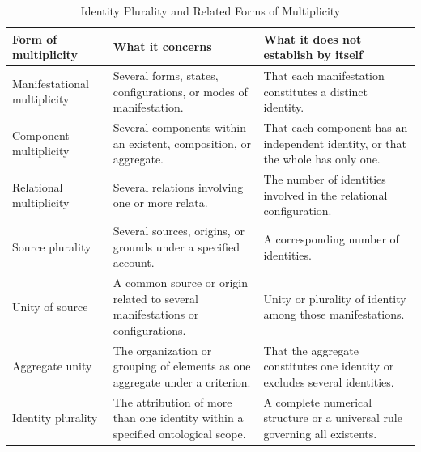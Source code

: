 %
%
%
%

\begin{table}[htbp]
\centering
\caption{Identity Plurality and Related Forms of Multiplicity}
\label{tab:identity-plurality-and-related-multiplicity}

\small
\renewcommand{\arraystretch}{1.35}

\begin{tabular}{p{} p{} p{}}
\hline
\textbf{Form of multiplicity}
&
\textbf{What it concerns}
&
\textbf{What it does not establish by itself}
\\
\hline

Manifestational multiplicity
&
Several forms, states, configurations, or modes of manifestation.
&
That each manifestation constitutes a distinct identity.
\\

Component multiplicity
&
Several components within an existent, composition, or aggregate.
&
That each component has an independent identity, or that the whole has only one.
\\

Relational multiplicity
&
Several relations involving one or more relata.
&
The number of identities involved in the relational configuration.
\\

Source plurality
&
Several sources, origins, or grounds under a specified account.
&
A corresponding number of identities.
\\

Unity of source
&
A common source or origin related to several manifestations or configurations.
&
Unity or plurality of identity among those manifestations.
\\

Aggregate unity
&
The organization or grouping of elements as one aggregate under a criterion.
&
That the aggregate constitutes one identity or excludes several identities.
\\

Identity plurality
&
The attribution of more than one identity within a specified ontological scope.
&
A complete numerical structure or a universal rule governing all existents.
\\

\hline
\end{tabular}

\end{table}

